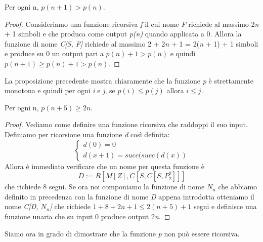 \begin{prop}Per ogni n, $p(n + 1) > p(n)$.
\end{prop}
\begin{proof} 
Consideriamo una funzione ricorsiva \emph{f} il cui nome \emph{F} richiede al massimo 2\emph{n} + 1 simboli e che produca come output \emph{p(n)} quando applicata a 0. Allora la funzione di nome \emph{C[S, F]} richiede al massimo 2 + 2\emph{n} + 1 = 2(\emph{n} + 1) + 1 simboli e produce su 0 un output pari a \emph{$p(n) + 1 > p(n)$} e quindi \emph{$p(n + 1) \geq p(n) + 1 > p(n)$}. 
\end{proof}

La proposizione precedente mostra chiaramente che la funzione \emph{p} è strettamente monotona e quindi per ogni \emph{i} e \emph{j}, se \emph{$p(i) \leq p(j)$} allora \emph{$i \leq j$}.

\begin{prop}Per ogni n, $p(n + 5) \geq 2n$.
\end{prop}
\begin{proof} 
Vediamo come definire una funzione ricorsiva che raddoppi il suo input. Definiamo per ricorsione una funzione \emph{d} così definita:
$$\left\{
\begin{array}{ll} d(0) = 0\\
                d(x + 1) = succ(succ(d(x))
\end{array} \right.$$
 Allora è immediato verificare che un nome per questa funzione è 
$$D := R[M[Z], C[S, C[S, P^2_2]]]$$ 
che richiede 8 segni.
Se ora noi componiamo la funzione di nome \emph{$N_n$} che abbiamo definito in precedenza con la funzione di nome \emph{D} appena introdotta otteniamo il nome \emph{C[D, $N_n$]} che richiede $1 + 8 + 2n + 1 \leq 2(n + 5) + 1$ segni e definisce una funzione unaria che su input 0 produce output 2\emph{n}. 
\end{proof}

Siamo ora in grado di dimostrare che la funzione \emph{p} non può essere ricorsiva.


